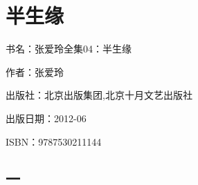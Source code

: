 

\section{半生缘}


\par 书名：张爱玲全集04：半生缘
\par 作者：张爱玲
\par 出版社：北京出版集团,北京十月文艺出版社
\par 出版日期：2012-06
\par ISBN：9787530211144






\subsection{一}

